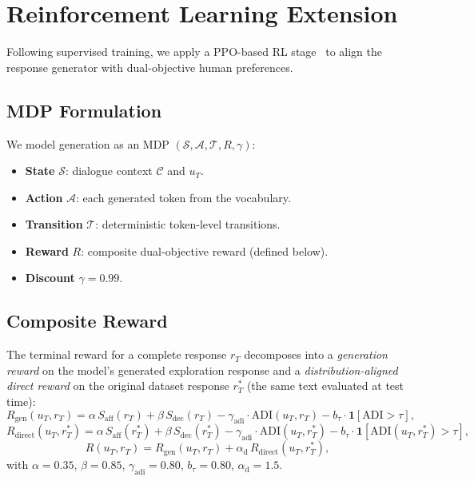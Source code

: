 \documentclass[lettersize,journal]{IEEEtran}
\begin{document}
\section{Reinforcement Learning Extension}
\label{sec:rl}

Following supervised training, we apply a PPO-based RL
stage~\cite{schulman2017ppo} to align the response generator with dual-objective
human preferences.

\subsection{MDP Formulation}

We model generation as an MDP $(\mathcal{S},\mathcal{A},\mathcal{T},R,\gamma)$:
\begin{itemize}
\item \textbf{State} $\mathcal{S}$: dialogue context $\mathcal{C}$ and $u_T$.
\item \textbf{Action} $\mathcal{A}$: each generated token from the vocabulary.
\item \textbf{Transition} $\mathcal{T}$: deterministic token-level transitions.
\item \textbf{Reward} $R$: composite dual-objective reward (defined below).
\item \textbf{Discount} $\gamma = 0.99$.
\end{itemize}

\subsection{Composite Reward}

The terminal reward for a complete response $r_T$ decomposes into a
\emph{generation reward} on the model's generated exploration response and
a \emph{distribution-aligned direct reward} on the original dataset response
$r_T^*$ (the same text evaluated at test time):
\begin{equation}
R_\mathrm{gen}(u_T, r_T)
  = \alpha\,S_\mathrm{aff}(r_T)
  + \beta\,S_\mathrm{dec}(r_T)
  - \gamma_\mathrm{adi}\cdot\mathrm{ADI}(u_T, r_T)
  - b_\tau\cdot\mathbf{1}[\mathrm{ADI}>\tau],
\label{eq:reward_gen}
\end{equation}
\begin{equation}
R_\mathrm{direct}(u_T, r_T^*)
  = \alpha\,S_\mathrm{aff}(r_T^*)
  + \beta\,S_\mathrm{dec}(r_T^*)
  - \gamma_\mathrm{adi}\cdot\mathrm{ADI}(u_T, r_T^*)
  - b_\tau\cdot\mathbf{1}[\mathrm{ADI}(u_T,r_T^*)>\tau],
\label{eq:reward_direct}
\end{equation}
\begin{equation}
R(u_T, r_T)
  = R_\mathrm{gen}(u_T, r_T)
  + \alpha_\mathrm{d}\,R_\mathrm{direct}(u_T, r_T^*),
\label{eq:reward}
\end{equation}
with $\alpha{=}0.35$, $\beta{=}0.85$, $\gamma_\mathrm{adi}{=}0.80$,
$b_\tau{=}0.80$, $\alpha_\mathrm{d}{=}1.5$.
\end{document}
